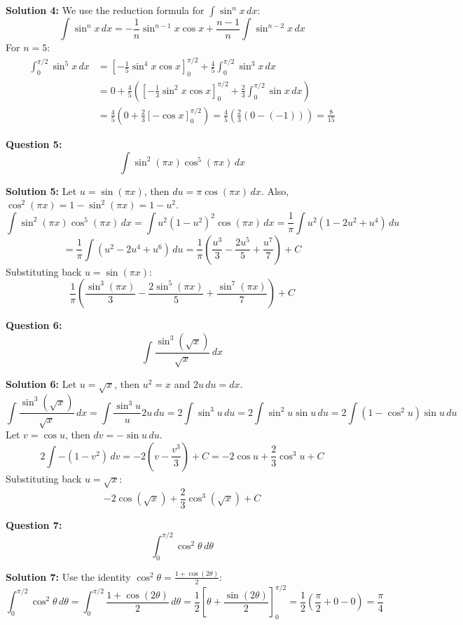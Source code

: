 \documentclass{article}
\begin{document}
\textbf{Solution 4:}
We use the reduction formula for $\int \sin^n x \, dx$:
\[ \int \sin^n x \, dx = -\frac{1}{n} \sin^{n-1} x \cos x + \frac{n-1}{n} \int \sin^{n-2} x \, dx \]
For $n=5$:
\begin{align*} \int_0^{\pi/2} \sin^5 x \, dx &= \left[ -\frac{1}{5} \sin^4 x \cos x \right]_0^{\pi/2} + \frac{4}{5} \int_0^{\pi/2} \sin^3 x \, dx \\ &= 0 + \frac{4}{5} \left( \left[ -\frac{1}{3} \sin^2 x \cos x \right]_0^{\pi/2} + \frac{2}{3} \int_0^{\pi/2} \sin x \, dx \right) \\ &= \frac{4}{5} \left( 0 + \frac{2}{3} [-\cos x]_0^{\pi/2} \right) = \frac{4}{5} \left( \frac{2}{3} (0 - (-1)) \right) = \frac{8}{15} \end{align*} 

\bigskip

\textbf{Question 5:}
\[ \int \sin^2 (\pi x) \cos^5 (\pi x) \, dx \]

\textbf{Solution 5:}
Let $u = \sin(\pi x)$, then $du = \pi \cos(\pi x) \, dx$. Also, $\cos^2(\pi x) = 1 - \sin^2(\pi x) = 1 - u^2$.
\[ \int \sin^2 (\pi x) \cos^5 (\pi x) \, dx = \int u^2 (1 - u^2)^2 \cos(\pi x) \, dx = \frac{1}{\pi} \int u^2 (1 - 2u^2 + u^4) \, du \]
\[ = \frac{1}{\pi} \int (u^2 - 2u^4 + u^6) \, du = \frac{1}{\pi} \left( \frac{u^3}{3} - \frac{2u^5}{5} + \frac{u^7}{7} \right) + C \]
Substituting back $u = \sin(\pi x)$:
\[ \frac{1}{\pi} \left( \frac{\sin^3(\pi x)}{3} - \frac{2\sin^5(\pi x)}{5} + \frac{\sin^7(\pi x)}{7} \right) + C \]

\bigskip

\textbf{Question 6:}
\[ \int \frac{\sin^3 (\sqrt{x})}{\sqrt{x}} \, dx \]

\textbf{Solution 6:}
Let $u = \sqrt{x}$, then $u^2 = x$ and $2u \, du = dx$.
\[ \int \frac{\sin^3 (\sqrt{x})}{\sqrt{x}} \, dx = \int \frac{\sin^3 u}{u} 2u \, du = 2 \int \sin^3 u \, du = 2 \int \sin^2 u \sin u \, du = 2 \int (1 - \cos^2 u) \sin u \, du \]
Let $v = \cos u$, then $dv = -\sin u \, du$.
\[ 2 \int -(1 - v^2) \, dv = -2 \left( v - \frac{v^3}{3} \right) + C = -2 \cos u + \frac{2}{3} \cos^3 u + C \]
Substituting back $u = \sqrt{x}$:
\[ -2 \cos(\sqrt{x}) + \frac{2}{3} \cos^3(\sqrt{x}) + C \]

\bigskip

\textbf{Question 7:}
\[ \int_0^{\pi/2} \cos^2 \theta \, d\theta \]

\textbf{Solution 7:}
Use the identity $\cos^2 \theta = \frac{1 + \cos(2\theta)}{2}$:
\[ \int_0^{\pi/2} \cos^2 \theta \, d\theta = \int_0^{\pi/2} \frac{1 + \cos(2\theta)}{2} \, d\theta = \frac{1}{2} \left[ \theta + \frac{\sin(2\theta)}{2} \right]_0^{\pi/2} = \frac{1}{2} \left( \frac{\pi}{2} + 0 - 0 \right) = \frac{\pi}{4} \]
\end{document}
